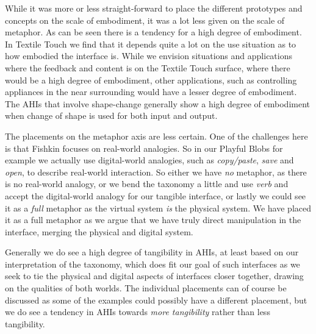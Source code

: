 While it was more or less straight-forward to place the different prototypes and concepts on the scale of embodiment, it was a lot less given on the scale of metaphor.
As can be seen there is a tendency for a high degree of embodiment.
In Textile Touch we find that it depends quite a lot on the use situation as to how embodied the interface is.
While we envision situations and applications where the feedback and content is on the Textile Touch surface, where there would be a high degree of embodiment, other applications, such as controlling appliances in the near surrounding would have a lesser degree of embodiment.
The AHIs that involve shape-change generally show a high degree of embodiment when change of shape is used for both input and output.

The placements on the metaphor axis are less certain.
One of the challenges here is that Fishkin focuses on real-world analogies.
So in our Playful Blobs for example we actually use digital-world analogies, such as \emph{copy/paste}, \emph{save} and \emph{open}, to describe real-world interaction.
So either we have \emph{no} metaphor, as there is no real-world analogy, or we bend the taxonomy a little and use \emph{verb} and accept the digital-world analogy for our tangible interface, or lastly we could see it as a \emph{full} metaphor as the virtual system \emph{is} the
physical system. 
We have placed it as a full metaphor as we argue that we have truly direct manipulation in the interface, merging the physical and digital system.

Generally we do see a high degree of tangibility in AHIs, at least based on our interpretation of the taxonomy, which does fit our goal of such interfaces as we seek to tie the physical and digital aspects of interfaces closer together, drawing on the qualities of both worlds.
The individual placements can of course be discussed as some of the examples could possibly have a different placement, but we do see a tendency in AHIs towards \emph{more tangibility} rather than less tangibility. 
